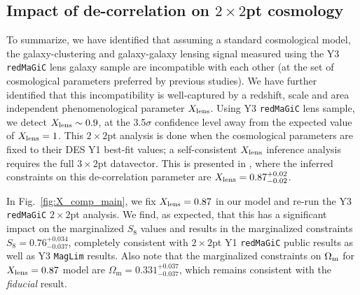 \documentclass[aps, prd,twocolumn,superscriptaddress,nofootinbib,preprintnumbers]{revtex4-1}
\newcommand{\om}{\ensuremath{\Omega_{\mathrm m}}}
\newcommand{\redmagic}{\texttt{redMaGiC} }
\newcommand{\maglim}{\texttt{MagLim} }
\begin{document}
\subsection{Impact of de-correlation on $2\times 2$pt cosmology}
\label{sec:X_cosmo_impact}
To summarize, we have identified that assuming a standard cosmological model, the galaxy-clustering and galaxy-galaxy lensing signal measured using the Y3 \redmagic lens galaxy sample are incompatible with each other (at the set of cosmological parameters preferred by previous studies). We have further identified that this incompatibility is well-captured by a redshift, scale and area independent phenomenological parameter $X_{\rm lens}$. Using Y3 \redmagic lens sample, we detect $X_{\rm lens} \sim 0.9$, at the 3.5$\sigma$ confidence level away from the expected value of $X_{\rm lens} = 1$. This $2\times2$pt analysis is done when the cosmological parameters are fixed to their DES Y1 best-fit values; a self-consistent $X_{\rm lens}$ inference analysis requires the full $3\times2$pt datavector. This is presented in \citet*{y3-3x2ptkp}, where the inferred constraints on this de-correlation parameter are $X_{\rm lens} = 0.87^{+0.02}_{-0.02}$. 

In Fig.~\ref{fig:X_comp_main}, we fix  $X_{\rm lens} = 0.87$ in our model and re-run the Y3 \redmagic $2\times2$pt analysis. We find, as expected, that this has a significant impact on the marginalized $S_8$ values and results in the marginalized constraints $S_8 = 0.76_{-0.037}^{+0.034}$, completely consistent with $2\times2$pt Y1 \redmagic public results as well as Y3 \maglim results. Also note that the marginalized constraints on $\Omega_{\rm m}$ for $X_{\rm lens} = 0.87$ model are $\om = 0.331^{+0.037}_{-0.037}$, which remains consistent with the \textit{fiducial} result. 

\end{document}
